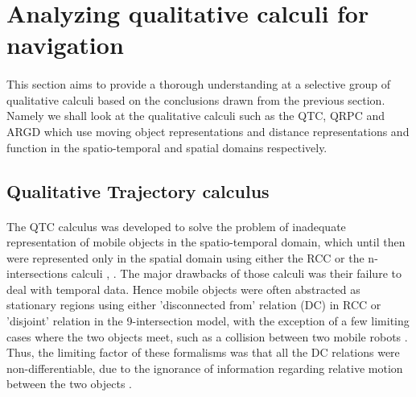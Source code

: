 	\section{Analyzing qualitative calculi for navigation}
	\paragraph{} This section aims to provide a thorough understanding at a selective group of qualitative calculi based on the conclusions drawn from the previous section. Namely we shall look at the qualitative calculi such as the QTC, QRPC and ARGD which use moving object representations and distance representations and function in the spatio-temporal and spatial domains respectively.
	\subsection{Qualitative Trajectory calculus}
	\paragraph{}The QTC calculus was developed to solve the problem of inadequate representation of mobile objects in the spatio-temporal domain, which until then were represented only in the spatial domain using either the RCC or the n-intersections calculi \cite{van2006qualitative}, \cite{van2005qualitative}. The major drawbacks of those calculi was their failure to deal with temporal data. Hence mobile objects were often abstracted as stationary regions using either 'disconnected from' relation (DC) in RCC or 'disjoint' relation in the 9-intersection model, with the exception of a few limiting cases where the two objects meet, such as a collision between two mobile robots \cite{van2004representing}. Thus, the limiting factor of these formalisms was that all the DC relations were non-differentiable, due to the ignorance of information regarding relative motion between the two objects .
